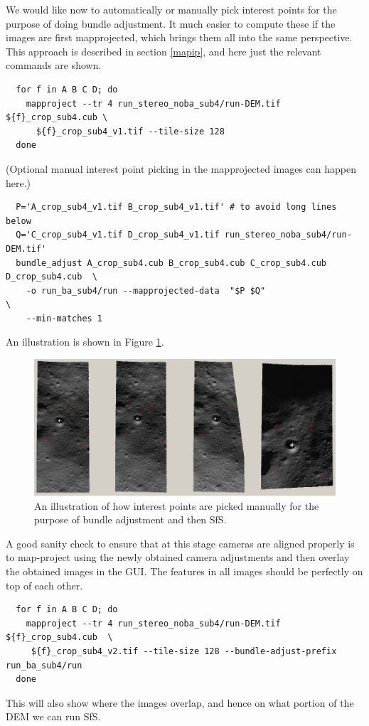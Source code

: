We would like now to automatically or manually pick interest points for
the purpose of doing bundle adjustment. It much easier to compute these
if the images are first mapprojected, which brings them all into the
same perspective. This approach is described in section \ref{mapip}, and
here just the relevant commands are shown.

\begin{verbatim}
  for f in A B C D; do 
    mapproject --tr 4 run_stereo_noba_sub4/run-DEM.tif ${f}_crop_sub4.cub \
      ${f}_crop_sub4_v1.tif --tile-size 128
  done
\end{verbatim}

(Optional manual interest point picking in the mapprojected images can happen here.)

\begin{verbatim}
  P='A_crop_sub4_v1.tif B_crop_sub4_v1.tif' # to avoid long lines below
  Q='C_crop_sub4_v1.tif D_crop_sub4_v1.tif run_stereo_noba_sub4/run-DEM.tif'
  bundle_adjust A_crop_sub4.cub B_crop_sub4.cub C_crop_sub4.cub D_crop_sub4.cub  \
    -o run_ba_sub4/run --mapprojected-data  "$P $Q"                              \
    --min-matches 1
\end{verbatim}

An illustration is shown in Figure \ref{fig:sfs3}.

\begin{figure}[t!]
  \begin{center}
    \includegraphics[width=7in]{images/sfs3.jpg}
    \caption[sfs]{An illustration of how interest points are picked manually for the purpose of bundle adjustment and then SfS.}
    \label{fig:sfs3}
  \end{center}
\end{figure}

A good sanity check to ensure that at this stage cameras are aligned
properly is to map-project using the newly obtained camera adjustments
and then overlay the obtained images in the GUI.  The features in all
images should be perfectly on top of each other.
\begin{verbatim}
  for f in A B C D; do 
    mapproject --tr 4 run_stereo_noba_sub4/run-DEM.tif ${f}_crop_sub4.cub  \
     ${f}_crop_sub4_v2.tif --tile-size 128 --bundle-adjust-prefix run_ba_sub4/run
  done
\end{verbatim}
This will also show where the images overlap, and hence on what portion of the DEM we
can run SfS.


